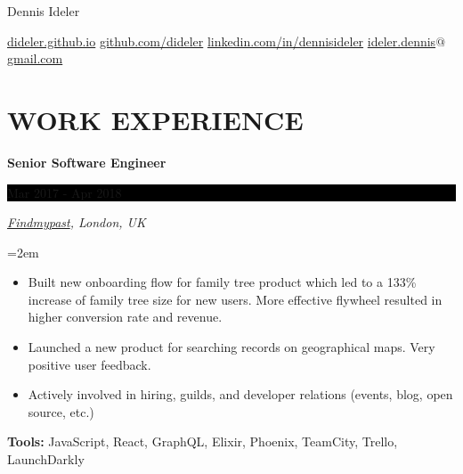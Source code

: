 \documentclass[paper=a4,fontsize=11pt]{scrartcl} %
\newlength{\spacebox}
\newcommand{\sepspace}{\vspace*{1em}}     %
\newcommand{\FullName}[1]{
    \Huge \usefont{OT1}{phv}{b}{n} \hfill #1
    \par \normalsize \normalfont}
\newcommand{\Slogan}[1]{
    \large \usefont{OT1}{phv}{m}{n}\hfill \textit{#1}
    \par \normalsize \normalfont}
\newcommand{\NewPart}[1]{\section*{\uppercase{#1}}}
\newcommand{\PersonalEntry}[2]{
    \noindent\hangindent=2em\hangafter=0  %
    \parbox{\spacebox}{                   %
    \textit{#1}}                          %
    \hspace{1.5em} #2 \par}               %
\newcommand{\EducationEntry}[4]{
    \noindent \textbf{#1} \hfill        %
    \colorbox{Black}{
      \parbox{8.5em}{
      \hfill\color{White}#2}} \par      %
    \noindent \textit{#3} \par          %
    \noindent\hangindent=2em\hangafter=0 \small #4 %
    \normalsize \par}
\newcommand{\WorkEntry}[4]{             %
    \noindent \textbf{#1} \hfill        %
    \colorbox{Black}{%
      \parbox{9em}{%
      \hfill\color{White}#2}} \par      %
        \noindent \textit{#3} \par      %
    \noindent\hangindent=2em\hangafter=0 \small #4 %
    \normalsize \par}
\begin{document}
\FullName{Dennis Ideler}
\bigskip
{\small
  \href{https://dideler.github.io}{dideler.github.io} \quad
  \href{https://github.com/dideler}{github.com/dideler} \quad
  \href{https://linkedin.com/in/dennisideler}{linkedin.com/in/dennisideler} \quad
  \href{mailto:ideler.dennis@gmail.com}{ideler.dennis$@$gmail.com}
}

\sepspace

%


\NewPart{Work experience}{}


\WorkEntry{Senior Software Engineer}{Mar 2017 - Apr 2018}
{\href{https://www.findmypast.co.uk/}{Findmypast}, London, UK}
{
  \begin{itemize} \itemsep -1pt
    \item Built new onboarding flow for family tree product which led to a 133\% increase of family tree size for new users.
    More effective flywheel resulted in higher conversion rate and revenue.
    \item Launched a new product for searching records on geographical maps. Very positive user feedback.
    \item Actively involved in hiring, guilds, and developer relations (events, blog, open source, etc.)
  \end{itemize}
  \textbf{Tools:} JavaScript, React, GraphQL, Elixir, Phoenix, TeamCity, Trello, LaunchDarkly
}
\sepspace
\end{document}
